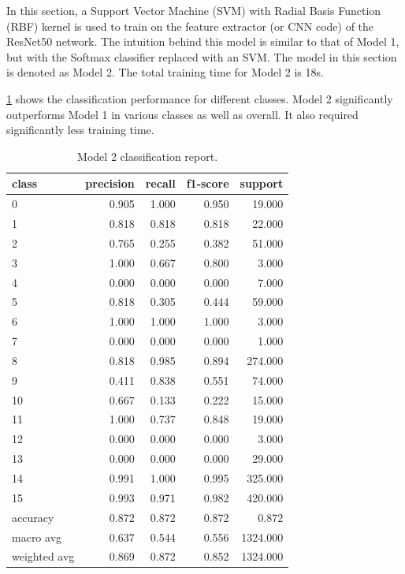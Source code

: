 \documentclass[twocolumn]{article}
\begin{document}
In this section, a Support Vector Machine (SVM) with Radial Basis Function (RBF) kernel is used to train on the feature extractor (or CNN code) of the ResNet50 network. The intuition behind this model is similar to that of Model 1, but with the Softmax classifier replaced with an SVM. The model in this section is denoted as Model 2. The total training time for Model 2 is 18s.

\cref{tab:model2-class-report} shows the classification performance for different classes. Model 2 significantly outperforms Model 1 in various classes as well as overall. It also required significantly less training time.

\begin{table}
    \centering
    \caption{Model 2 classification report.}
    \label{tab:model2-class-report}
    \begin{tabular}{lrrrr}
    \toprule
    class &  precision &  recall &  f1-score &   support \\
    \midrule
    0            &      0.905 &   1.000 &     0.950 &    19.000 \\
    1            &      0.818 &   0.818 &     0.818 &    22.000 \\
    2            &      0.765 &   0.255 &     0.382 &    51.000 \\
    3            &      1.000 &   0.667 &     0.800 &     3.000 \\
    4            &      0.000 &   0.000 &     0.000 &     7.000 \\
    5            &      0.818 &   0.305 &     0.444 &    59.000 \\
    6            &      1.000 &   1.000 &     1.000 &     3.000 \\
    7            &      0.000 &   0.000 &     0.000 &     1.000 \\
    8            &      0.818 &   0.985 &     0.894 &   274.000 \\
    9            &      0.411 &   0.838 &     0.551 &    74.000 \\
    10           &      0.667 &   0.133 &     0.222 &    15.000 \\
    11           &      1.000 &   0.737 &     0.848 &    19.000 \\
    12           &      0.000 &   0.000 &     0.000 &     3.000 \\
    13           &      0.000 &   0.000 &     0.000 &    29.000 \\
    14           &      0.991 &   1.000 &     0.995 &   325.000 \\
    15           &      0.993 &   0.971 &     0.982 &   420.000 \\
    accuracy     &      0.872 &   0.872 &     0.872 &     0.872 \\
    macro avg    &      0.637 &   0.544 &     0.556 &  1324.000 \\
    weighted avg &      0.869 &   0.872 &     0.852 &  1324.000 \\
    \bottomrule
    \end{tabular}
    \end{table}
\end{document}
